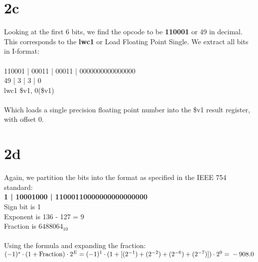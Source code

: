 \documentclass[10pt,a4paper]{article}
\begin{document}
	\section*{2c}
 Looking at the first 6 bits, we find the opcode to be \textbf{110001} or 49 in decimal. This corresponds to the \textbf{lwc1} or Load Floating Point Single. We extract all bits in I-format: \\\\
	110001 | 00011 | 00011 | 0000000000000000 \\
	49 | 3 | 3 | 0 \\
	lwc1 \$v1, 0(\$v1) \\\\
	Which loads a single precision floating point number into the \$v1 result register, with offset 0.  
	\section*{2d}
	Again, we partition the bits into the format as specified in the IEEE 754 standard: \\
	\textbf{1 | 10001000 | 11000110000000000000000} \\
	Sign bit is 1 \\
	Exponent is 136 - 127 = 9\\
	Fraction is $6488064_{10}$ \\\\
	Using the formula and expanding the fraction: \\ $(-1)^s \cdot (1 + \text{Fraction}) \cdot 2^E = \\ (-1)^1 \cdot (1 + [(2^{-1}) + (2^{-2}) + (2^{-6}) + (2^{-7})]) \cdot 2^{9} = \\ -908.0$
	
\end{document}
